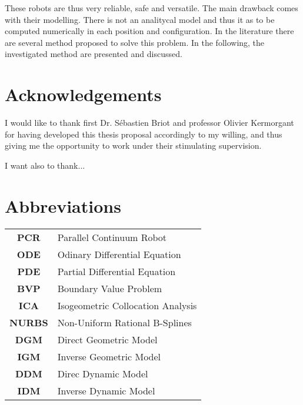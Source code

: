\documentclass{thesisreport}
\begin{document}
 These robots are thus very reliable, safe and versatile. The main drawback comes with their modelling. There is not an analitycal model and thus it as to be computed numerically in each position and configuration. In the literature there are several method proposed to solve this problem. In the following, the investigated method are presented and discussed. 
 
 
 \newpage
 
 \section*{Acknowledgements}
 I would like to thank first Dr. Sébastien Briot and professor Olivier Kermorgant for having developed this thesis proposal accordingly to my willing, and thus giving me the opportunity to work under their stimulating supervision. 
 
 I want also to thank...
 
  \section*{Abbreviations}
 \begin{tabular}{cp{}}
 	\textbf{PCR}	&	Parallel Continuum Robot			\\
 	\textbf{ODE}	&	Odinary Differential Equation		\\
 	\textbf{PDE}	&	Partial Differential Equation		\\
 	\textbf{BVP}	&	Boundary Value Problem				\\
 	\textbf{ICA}	&	Isogeometric Collocation Analysis	\\
 	\textbf{NURBS}	&	Non-Uniform Rational B-Splines		\\
 	\textbf{DGM}	&	Direct Geometric Model				\\
 	\textbf{IGM}	&	Inverse Geometric Model				\\
 	\textbf{DDM}	&	Direc Dynamic Model					\\
 	\textbf{IDM}	&	Inverse Dynamic Model				\\
 \end{tabular}

 \tableofcontents
 
 
\end{document}

